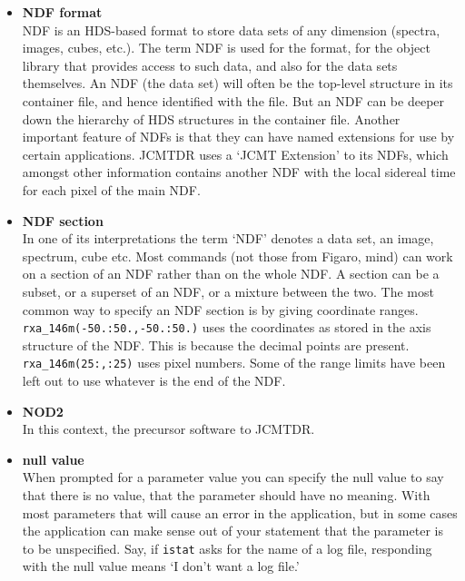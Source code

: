 \documentclass[11pt]{article}
\newcommand{\xref}[3]{#1}
\begin{document}
\begin{itemize}
\item{\bf \label{glossndf}NDF format}\\
\xref{NDF}{sun33}{}
   is an HDS-based format to store
   data sets of any dimension (spectra, images, cubes, etc.). The term
   NDF is used for the format, for the object library that provides
   access to such data, and also for the data sets themselves. An NDF
   (the data set) will often be the top-level structure in its container
   file, and hence identified with the file. But an NDF can be deeper
   down the hierarchy of HDS structures in the container file. Another
   important feature of NDFs is that they can have
\xref{named extensions}{sun33}{extensions}
   for use by certain applications. JCMTDR uses a `JCMT Extension' to its
   NDFs, which amongst other information contains another NDF with the
   local sidereal time for each pixel of the main NDF.

\item{\bf \label{glossndfsection}NDF section}\\
   In one of its interpretations
   the term `NDF' denotes a data set, an image, spectrum, cube etc.
   Most commands (not those from Figaro, mind) can work on a
\xref{section of an NDF}{sun33}{ndf_sections}
   rather than on the whole NDF. A section can be a subset, or a
   superset of an NDF, or a mixture between the two. The most common way
   to specify an NDF section is by giving coordinate ranges.
   {\tt rxa\_146m(-50.:50.,-50.:50.)} uses the coordinates as stored
   in the axis structure of the NDF. This is because the decimal points
   are present. {\tt rxa\_146m(25:,:25)} uses pixel numbers. Some of
   the range limits have been left out to use whatever is the end of the
   NDF.

\item{\bf \label{glossnod2}NOD2}\\
   In this context, the precursor software to
   JCMTDR.

\item{\bf \label{glossnullvalue}null value}\\
   When prompted for a parameter
   value you can specify the null value to say that there is no value,
   that the parameter should have no meaning. With most parameters that
   will cause an error in the application, but in some cases the
   application can make sense out of your statement that the parameter
   is to be unspecified. Say, if {\tt istat} asks for the name of a log
   file, responding with the null value means `I don't want a log file.'


\end{itemize}
\end{document}
